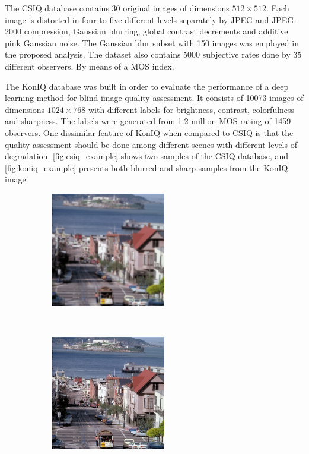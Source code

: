 The CSIQ database contains 30 original images of dimensions $512 \times 512$. Each image is distorted in four to five different levels separately by JPEG and JPEG-2000 compression, Gaussian blurring, global contrast decrements and additive pink Gaussian noise. The Gaussian blur subset with 150 images was employed in the proposed analysis. The dataset also contains 5000 subjective rates done by 35 different observers, By means of a MOS index. 

The KonIQ database was built in order to evaluate the performance of a deep learning method for blind image quality assessment. It consists of 10073 images of dimensions $1024 \times 768$ with different labels for brightness, contrast, colorfulness and sharpness. The labels were generated from 1.2 million MOS rating of 1459 observers. One dissimilar feature of KonIQ when compared to CSIQ is that the quality assessment should be done among different scenes with different levels of degradation. \autoref{fig:csiq_example} shows two samples of the CSIQ database, and \autoref{fig:koniq_example} presents both blurred and sharp samples from the KonIQ image.

\begin{figure}[htb]
    \centering
    \caption{Samples from the CSIQ database: blurred image (a) and sharp image (b).}
    \label{fig:csiq_example}
    \begin{subfigure}[t]{0.45\textwidth}
        \centering
        \includegraphics[height=5cm]{images/csiq_blurred.png}
        \caption{}
    \end{subfigure}%
    ~ 
    \begin{subfigure}[t]{0.5\textwidth}
        \centering
        \includegraphics[height=5cm]{images/csiq_sharp.png}
        \caption{}
    \end{subfigure}
    \centering
\end{figure}

